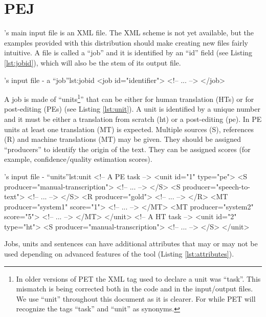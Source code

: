 \section{PEJ}\label{sec:pej}

\PET's main input file is an XML file. The XML scheme is not yet available, but the examples provided with this distribution should make creating new files fairly intuitive.
A file is called a ``job'' and it is identified by an ``id'' field (see Listing \ref{lst:jobid}), which will also be the stem of its output file.

\begin{workflow-code}{\PET's input file - a ``job''}{lst:jobid}
<job id="identifier">
	<!-- ... -->
</job>
\end{workflow-code}

A job is made of ``units\footnote{In older versions of PET the XML tag used to declare a unit was ``task''. This mismatch is being corrected both in the code and in the input/output files. We use ``unit'' throughout this document as it is clearer. For while PET will recognize the tags ``task'' and ``unit'' as synonyms.}'' that can be either for human translation (HTs) or for post-editing (PEs) (see Listing \ref{lst:unit}).
A unit is identified by a unique number and it must be either a translation from scratch (ht) or a post-editing (pe). In PE units at least one translation (MT) is expected.
Multiple sources (S), references (R) and machine translations (MT) may be given. They should be assigned ``producers'' to identify the origin of the text. They can be assigned scores (for example, confidence/quality estimation scores).

\begin{workflow-code}{\PET's input file - ``units''}{lst:unit}
<!-- A PE task -->
<unit id="1" type="pe"> 
	<S producer="manual-transcription"> 
		<!-- ... -->
	</S>
	<S producer="speech-to-text">
		<!-- ... -->
	</S>
	<R producer="gold">
		<!-- ... -->
	</R>
	<MT producer="system1" score="1">
		<!-- ... -->
	</MT>
	<MT producer="system2" score="5">
		<!-- ... -->
	</MT>
</unit>
<!-- A HT task -->
<unit id="2" type="ht"> 
	<S producer="manual-transcription"> 
		<!-- ... -->
	</S>
</unit>
\end{workflow-code}

Jobs, units and sentences can have additional attributes that may or may not be used depending on advanced features of the tool (Listing \ref{lst:attributes}).

